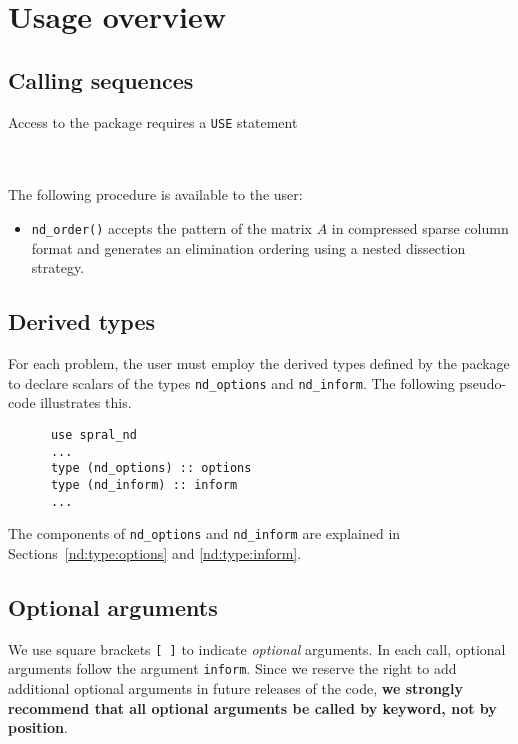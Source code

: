 
\section{Usage overview}

\subsection{Calling sequences}

Access to the package requires a {\tt USE} statement \\ \\
\indent\hspace{8mm}{\tt use spral\_nd} \\

\medskip

\noindent
The following procedure is available to the user:
\begin{itemize}
\item {\tt nd\_order()} accepts the  pattern of the 
matrix $A$ in compressed sparse column format and generates an elimination ordering 
using a nested dissection strategy.


\end{itemize}



\subsection{Derived types}

For each problem, the user must employ the derived types defined by the
package to declare scalars of the types
{\tt nd\_options} and {\tt nd\_inform}.
The following pseudo-code illustrates this.
\begin{verbatim}
      use spral_nd
      ...
      type (nd_options) :: options
      type (nd_inform) :: inform
      ...
\end{verbatim}
The components of {\tt nd\_options} and {\tt nd\_inform} are explained
in Sections~\ref{nd:type:options} and \ref{nd:type:inform}.

\subsection{Optional arguments}

We use square brackets {\tt [ ]} to indicate {\it optional} arguments.
In each
call, optional arguments follow the argument {\tt inform}.  Since we
reserve the right to add additional optional arguments in future
releases of the code, {\bf we strongly recommend that all optional
arguments be called by keyword, not by position}.

